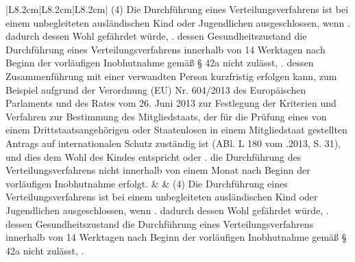 \documentclass[10pt,a4paper,landscape]{article}
\begin{document}
\begin{longtable}{|L{8.2cm}|L{8.2cm}|L{8.2cm}|}
(4) Die Durchführung eines  \newline Verteilungsverfahrens ist bei einem  \newline unbegleiteten ausländischen Kind oder  \newline Jugendlichen ausgeschlossen, wenn   . dadurch dessen Wohl gefährdet würde,   . dessen Gesundheitszustand die  \newline Durchführung eines Verteilungsverfahrens  \newline innerhalb von 14 Werktagen nach Beginn  \newline der vorläufigen Inobhutnahme gemäß \S{}  \newline 42a nicht zulässt,  .   dessen Zusammenführung mit einer  \newline verwandten Person kurzfristig erfolgen  \newline kann, zum Beispiel aufgrund der  \newline Verordnung (EU) Nr. 604/2013 des  \newline Europäischen Parlaments und des Rates  \newline vom 26. Juni 2013 zur Festlegung der  \newline Kriterien und Verfahren zur Bestimmung  \newline des Mitgliedstaats, der für die Prüfung  \newline eines von einem Drittstaatsangehörigen  \newline oder Staatenlosen in einem Mitgliedstaat  \newline gestellten Antrags auf internationalen  \newline Schutz zuständig ist (ABl. L 180 vom  .2013, S. 31), und dies dem Wohl des  \newline Kindes entspricht oder   .   die Durchführung des  \newline Verteilungsverfahrens nicht innerhalb von  \newline \textcolor{diffred}{einem Monat} nach Beginn der vorläufigen  \newline Inobhutnahme erfolgt. &  & (4) Die Durchführung eines  \newline Verteilungsverfahrens ist bei einem  \newline unbegleiteten ausländischen Kind oder  \newline Jugendlichen ausgeschlossen, wenn   . dadurch dessen Wohl gefährdet würde,   . dessen Gesundheitszustand die  \newline Durchführung eines Verteilungsverfahrens  \newline innerhalb von 14 Werktagen nach Beginn  \newline der vorläufigen Inobhutnahme gemäß \S{}  \newline 42a nicht zulässt,  . 
\end{longtable}
\end{document}
